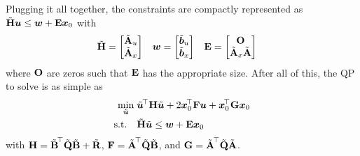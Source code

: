 			Plugging it all together, the constraints are compactly represented as \( \tilde{\bm{\mathrm{H}}} \bm{u} \leq \bm{w} + \bm{\mathrm{E}} \bm{x}_0 \) with
			\begin{align}
				\tilde{\bm{\mathrm{H}}} &= \begin{bmatrix} \tilde{\bm{\mathrm{A}}}_u \\ \tilde{\bm{\mathrm{A}}}_x \end{bmatrix} &
				\bm{w} &= \begin{bmatrix} \tilde{\bm{b}}_u \\ \tilde{\bm{b}}_x \end{bmatrix} &
				\bm{\mathrm{E}} &= \begin{bmatrix} \bm{\mathrm{O}} \\ \tilde{\bm{\mathrm{A}}}_x \tilde{\bm{\mathrm{A}}} \end{bmatrix}
			\end{align}
			where \(\bm{\mathrm{O}}\) are zeros such that \(\bm{\mathrm{E}}\) has the appropriate size. After all of this, the QP to solve is as simple as
			\begin{equation}
				\begin{aligned}
					\min_{\tilde{\bm{u}}}\; & \tilde{\bm{u}}^{\!\top} \bm{\mathrm{H}} \tilde{\bm{u}} + 2 \bm{x}_0^{\!\top} \bm{\mathrm{F}} \bm{u} + \bm{x}_0^{\!\top} \bm{\mathrm{G}} \bm{x}_0 \\
					\text{s.t.}\quad &
						\begin{aligned}
							\tilde{\bm{\mathrm{H}}} \tilde{\bm{u}} &\leq \bm{w} + \bm{\mathrm{E}} \bm{x}_0
						\end{aligned}
				\end{aligned}
				\label{eqn:qpA}
			\end{equation}
			with \( \bm{\mathrm{H}} = \tilde{\bm{\mathrm{B}}}^{\!\top} \tilde{\bm{\mathrm{Q}}} \tilde{\bm{\mathrm{B}}} + \tilde{\bm{\mathrm{R}}} \), \( \bm{\mathrm{F}} = \tilde{\bm{\mathrm{A}}}^{\!\top} \tilde{\bm{\mathrm{Q}}} \tilde{\bm{\mathrm{B}}} \), and \( \bm{\mathrm{G}} = \tilde{\bm{\mathrm{A}}}^{\!\top} \tilde{\bm{\mathrm{Q}}} \tilde{\bm{\mathrm{A}}} \).

